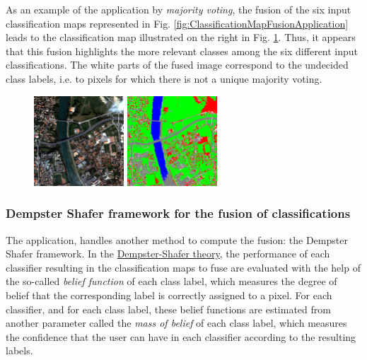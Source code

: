 As an example of the  application by 
\emph{majority voting}, the fusion of the six input classification maps 
represented in Fig. \ref{fig:ClassificationMapFusionApplication} leads to the 
classification map illustrated on the right in Fig. \ref{fig:ClassificationMapFusionApplicationMV}. 
Thus, it appears that this fusion highlights the more relevant classes among the six  
different input classifications. The white parts of the fused image correspond to 
the undecided class labels, i.e. to pixels for which there is not a unique 
majority voting.


\begin{figure}[!h]
  \center
  \includegraphics[width=0.3\textwidth]{../Art/MonteverdiImages/classification_chain_inputimage.jpg}
  \includegraphics[width=0.3\textwidth]{../Art/MonteverdiImages/QB_1_ortho_MV_C123456_CM.png}
  \label{fig:ClassificationMapFusionApplicationMV}
\end{figure}


\subsubsection{Dempster Shafer framework for the fusion of classifications}

The  application, handles another method to 
compute the fusion: the Dempster Shafer framework. 
In the \href{http://en.wikipedia.org/wiki/Dempster-Shafer\_theory}{Dempster-Shafer theory}, 
the performance of each classifier resulting in the classification maps to fuse are 
evaluated with the help of the so-called \emph{belief function} of each class label, 
which measures the degree of belief that the corresponding label is correctly assigned 
to a pixel. For each classifier, and for each class label, these belief
functions are estimated from another parameter called the \emph{mass of belief} of each class label, 
which measures the confidence that the user can have in each classifier according to 
the resulting labels.

